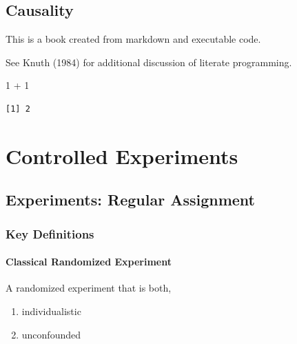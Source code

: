 \documentclass[
  letterpaper,
  DIV=11,
  numbers=noendperiod]{scrreprt}
\newenvironment{Shaded}{\begin{snugshade}}{\end{snugshade}}
\newcommand{\DecValTok}[1]{\textcolor[rgb]{0.68,0.00,0.00}{#1}}
\newcommand{\SpecialCharTok}[1]{\textcolor[rgb]{0.37,0.37,0.37}{#1}}
\theoremstyle{definition}
\theoremstyle{remark}
\begin{document}

\hypertarget{causality}{%
\chapter{Causality}\label{causality}}

This is a book created from markdown and executable code.

See Knuth (1984) for additional discussion of literate programming.

\begin{Shaded}
\begin{Highlighting}[]
\DecValTok{1} \SpecialCharTok{+} \DecValTok{1}
\end{Highlighting}
\end{Shaded}

\begin{verbatim}
[1] 2
\end{verbatim}

\part{Controlled Experiments}

\hypertarget{experiments-regular-assignment}{%
\chapter{Experiments: Regular
Assignment}\label{experiments-regular-assignment}}

\hypertarget{key-definitions}{%
\section{Key Definitions}\label{key-definitions}}

\hypertarget{classical-randomized-experiment}{%
\subsection{Classical Randomized
Experiment}\label{classical-randomized-experiment}}

\begin{tcolorbox}[enhanced jigsaw, breakable, colframe=quarto-callout-note-color-frame, toptitle=1mm, toprule=.15mm, opacitybacktitle=0.6, opacityback=0, rightrule=.15mm, titlerule=0mm, colback=white, bottomtitle=1mm, title={Def. Classical Randomized Experiment}, arc=.35mm, coltitle=black, colbacktitle=quarto-callout-note-color!10!white, leftrule=.75mm, bottomrule=.15mm, left=2mm]

A randomized experiment that is both,

\par

\begin{enumerate}
\def\labelenumi{\arabic{enumi}.}
\item
  individualistic

  \par
\item
  unconfounded\footnotemark{}
\end{enumerate}

\end{tcolorbox}
\end{document}
